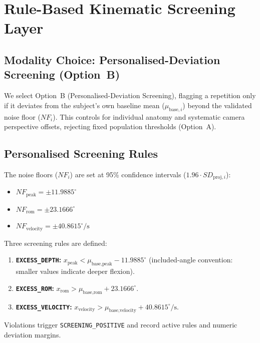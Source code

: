 \section{Rule-Based Kinematic Screening Layer}
\label{sec:screening-layer}

\subsection{Modality Choice: Personalised-Deviation Screening (Option~B)}
\label{sec:modality-choice}

We select Option~B (Personalised-Deviation Screening), flagging a repetition only if it deviates from the subject's own baseline mean ($\mu_{\text{base}, i}$) beyond the validated noise floor ($NF_i$). This controls for individual anatomy and systematic camera perspective offsets, rejecting fixed population thresholds (Option~A).

\subsection{Personalised Screening Rules}
\label{sec:screening-rules}

The noise floors ($NF_i$) are set at 95\% confidence intervals ($1.96 \cdot SD_{\text{proj}, i}$):
\begin{itemize}
  \item $NF_{\text{peak}} = \pm 11.9885^\circ$
  \item $NF_{\text{rom}} = \pm 23.1666^\circ$
  \item $NF_{\text{velocity}} = \pm 40.8615^\circ/\text{s}$
\end{itemize}

Three screening rules are defined:
\begin{enumerate}
  \item \textbf{\texttt{EXCESS\_DEPTH}:} $x_{\text{peak}} < \mu_{\text{base}, \text{peak}} - 11.9885^\circ$ (included-angle convention: smaller values indicate deeper flexion).
  \item \textbf{\texttt{EXCESS\_ROM}:} $x_{\text{rom}} > \mu_{\text{base}, \text{rom}} + 23.1666^\circ$.
  \item \textbf{\texttt{EXCESS\_VELOCITY}:} $x_{\text{velocity}} > \mu_{\text{base}, \text{velocity}} + 40.8615^\circ/\text{s}$.
\end{enumerate}

Violations trigger \texttt{SCREENING\_POSITIVE} and record active rules and numeric deviation margins.


